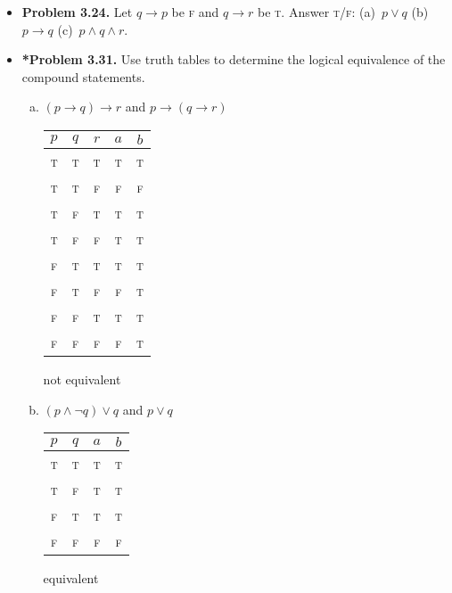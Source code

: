 \documentclass[11pt]{article}
\def\OR{\vee}
\def\AND{\wedge}
\def\imp{\rightarrow}
\begin{document}
\begin{itemize}
\vspace{0.1in}

\item \textbf{Problem 3.24.}
  Let $q\imp p$ be \textsc{f} and $q\imp r$ be \textsc{t}.
  Answer \textsc{t}/\textsc{f}: (a)~$p\OR q$ (b)~$p\imp q$ (c)~$p\AND q\AND r$.

\vspace{0.1in}

\item \textbf{*Problem 3.31.}
  Use truth tables to determine the logical equivalence of the compound statements.
  \begin{multicols}{2}
  \begin{enumerate}[(a)]
  \item $(p\imp q)\imp r$ and $p\imp (q\imp r)$
\\
\begin{tabular}{ccc|cc}
      $p$&$q$&$r$&$a$&$b$\\
      \hline
      \textsc{t}&\textsc{t}&\textsc{t}&\textsc{t}&\textsc{t}\\
      \textsc{t}&\textsc{t}&\textsc{f}&\textsc{f}&\textsc{f}\\
      \textsc{t}&\textsc{f}&\textsc{t}&\textsc{t}&\textsc{t}\\
      \textsc{t}&\textsc{f}&\textsc{f}&\textsc{t}&\textsc{t}\\
      \textsc{f}&\textsc{t}&\textsc{t}&\textsc{t}&\textsc{t}\\
      \textsc{f}&\textsc{t}&\textsc{f}&\textsc{f}&\textsc{t}\\
      \textsc{f}&\textsc{f}&\textsc{t}&\textsc{t}&\textsc{t}\\
      \textsc{f}&\textsc{f}&\textsc{f}&\textsc{f}&\textsc{t}\\
    \end{tabular}
not equivalent
  \item $(p\AND\neg q)\OR q$ and $p\OR q$\\
\begin{tabular}{cc|cc}
      $p$&$q$&$a$&$b$\\
      \hline
      \textsc{t}&\textsc{t}&\textsc{t}&\textsc{t}\\
      \textsc{t}&\textsc{f}&\textsc{t}&\textsc{t}\\
      \textsc{f}&\textsc{t}&\textsc{t}&\textsc{t}\\
      \textsc{f}&\textsc{f}&\textsc{f}&\textsc{f}\\
    \end{tabular}
equivalent
  \end{enumerate}
  \end{multicols}


\end{itemize}
\end{document}
